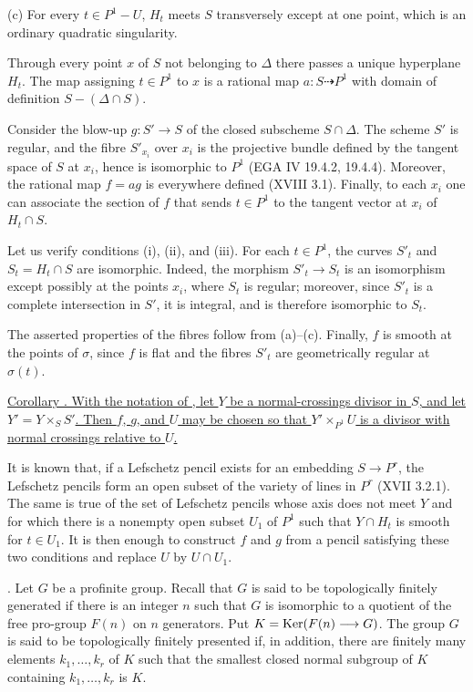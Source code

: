 (c) For every $t\in P^1-U$, $H_t$ meets $S$ transversely except at one
point, which is an ordinary quadratic singularity.

Through every point $x$ of $S$ not belonging to $\Delta$ there passes a
unique hyperplane $H_t$. The map assigning $t\in P^1$ to $x$ is a
rational map $a:S\dashrightarrow P^1$ with domain of definition
$S-(\Delta\cap S)$.

Consider the blow-up $g:S'\longrightarrow S$ of the closed subscheme
$S\cap\Delta$. The scheme $S'$ is regular, and the fibre $S'_{x_i}$ over
$x_i$ is the projective bundle defined by the tangent space of $S$ at
$x_i$, hence is isomorphic to $P^1$ (EGA IV 19.4.2, 19.4.4). Moreover,
the rational map $f=ag$ is everywhere defined (XVIII 3.1). Finally, to
each $x_i$ one can associate the section of $f$ that sends
$t\in P^1$ to the tangent vector at $x_i$ of $H_t\cap S$.

Let us verify conditions (i), (ii), and (iii). For each $t\in P^1$, the
curves $S'_t$ and $S_t=H_t\cap S$ are isomorphic. Indeed, the morphism
$S'_t\longrightarrow S_t$ is an isomorphism except possibly at the
points $x_i$, where $S_t$ is regular; moreover, since $S'_t$ is a
complete intersection in $S'$, it is integral, and is therefore
isomorphic to $S_t$.

The asserted properties of the fibres follow from (a)--(c). Finally,
$f$ is smooth at the points of $\sigma$, since $f$ is flat and the
fibres $S'_t$ are geometrically regular at $\sigma(t)$.


\underline{Corollary . With the notation of , let $Y$ be a
normal-crossings divisor in $S$, and let $Y'=Y\times_S S'$. Then $f$,
$g$, and $U$ may be chosen so that $Y'\times_{P^1}U$ is a divisor with
normal crossings relative to $U$.}

It is known that, if a Lefschetz pencil exists for an embedding
$S\longrightarrow P^r$, the Lefschetz pencils form an open subset of the
variety of lines in $P^r$ (XVII 3.2.1). The same is true of the set of
Lefschetz pencils whose axis does not meet $Y$ and for which there is a
nonempty open subset $U_1$ of $P^1$ such that $Y\cap H_t$ is smooth for
$t\in U_1$. It is then enough to construct $f$ and $g$ from a pencil
satisfying these two conditions and replace $U$ by $U\cap U_1$.

. Let $G$ be a profinite group. Recall that $G$ is said to be
topologically finitely generated if there is an integer $n$ such that
$G$ is isomorphic to a quotient of the free pro-group $F(n)$ on $n$
generators. Put $K=\operatorname{Ker}(F(n)\longrightarrow G)$. The group $G$ is said
to be topologically finitely presented if, in addition, there are
finitely many elements $k_1,\ldots,k_r$ of $K$ such that the smallest
closed normal subgroup of $K$ containing $k_1,\ldots,k_r$ is $K$.

